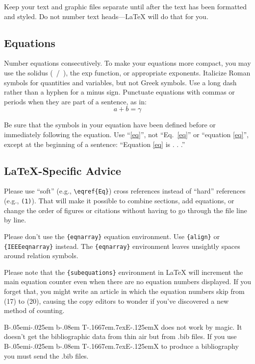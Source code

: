 \documentclass[conference]{IEEEtran}
\def\BibTeX{{\rm B\kern-.05em{\sc i\kern-.025em b}\kern-.08em
    T\kern-.1667em\lower.7ex\hbox{E}\kern-.125emX}}
\begin{document}
Keep your text and graphic files separate until after the text has been
formatted and styled. Do not number text heads---{\LaTeX} will do that
for you.

\subsection{Equations}
Number equations consecutively. To make your
equations more compact, you may use the solidus (~/~), the exp function, or
appropriate exponents. Italicize Roman symbols for quantities and variables,
but not Greek symbols. Use a long dash rather than a hyphen for a minus
sign. Punctuate equations with commas or periods when they are part of a
sentence, as in:
\begin{equation}
    a+b=\gamma\label{eq}
\end{equation}

Be sure that the
symbols in your equation have been defined before or immediately following
the equation. Use ``\eqref{eq}'', not ``Eq.~\eqref{eq}'' or ``equation \eqref{eq}'', except at
the beginning of a sentence: ``Equation \eqref{eq} is . . .''

\subsection{\LaTeX-Specific Advice}

Please use ``soft'' (e.g., \verb|\eqref{Eq}|) cross references instead
of ``hard'' references (e.g., \verb|(1)|). That will make it possible
to combine sections, add equations, or change the order of figures or
citations without having to go through the file line by line.

Please don't use the \verb|{eqnarray}| equation environment. Use
\verb|{align}| or \verb|{IEEEeqnarray}| instead. The \verb|{eqnarray}|
environment leaves unsightly spaces around relation symbols.

Please note that the \verb|{subequations}| environment in {\LaTeX}
will increment the main equation counter even when there are no
equation numbers displayed. If you forget that, you might write an
article in which the equation numbers skip from (17) to (20), causing
the copy editors to wonder if you've discovered a new method of
counting.

    {\BibTeX} does not work by magic. It doesn't get the bibliographic
data from thin air but from .bib files. If you use {\BibTeX} to produce a
bibliography you must send the .bib files.
\end{document}
